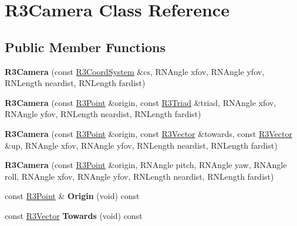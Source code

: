 \hypertarget{class_r3_camera}{}\section{R3\+Camera Class Reference}
\label{class_r3_camera}
\subsection*{Public Member Functions}
\begin{DoxyCompactItemize}
\item 
{\bfseries R3\+Camera} (const \hyperlink{class_r3_coord_system}{R3\+Coord\+System} \&cs, R\+N\+Angle xfov, R\+N\+Angle yfov, R\+N\+Length neardist, R\+N\+Length fardist)\hypertarget{class_r3_camera_a048a9fa556a75fad946f802abfe94a33}{}\label{class_r3_camera_a048a9fa556a75fad946f802abfe94a33}

\item 
{\bfseries R3\+Camera} (const \hyperlink{class_r3_point}{R3\+Point} \&origin, const \hyperlink{class_r3_triad}{R3\+Triad} \&triad, R\+N\+Angle xfov, R\+N\+Angle yfov, R\+N\+Length neardist, R\+N\+Length fardist)\hypertarget{class_r3_camera_a353a3e5700f2f310bec22535e25a28fd}{}\label{class_r3_camera_a353a3e5700f2f310bec22535e25a28fd}

\item 
{\bfseries R3\+Camera} (const \hyperlink{class_r3_point}{R3\+Point} \&origin, const \hyperlink{class_r3_vector}{R3\+Vector} \&towards, const \hyperlink{class_r3_vector}{R3\+Vector} \&up, R\+N\+Angle xfov, R\+N\+Angle yfov, R\+N\+Length neardist, R\+N\+Length fardist)\hypertarget{class_r3_camera_aeb02ab186aa2b8986279b48fed4b3eca}{}\label{class_r3_camera_aeb02ab186aa2b8986279b48fed4b3eca}

\item 
{\bfseries R3\+Camera} (const \hyperlink{class_r3_point}{R3\+Point} \&origin, R\+N\+Angle pitch, R\+N\+Angle yaw, R\+N\+Angle roll, R\+N\+Angle xfov, R\+N\+Angle yfov, R\+N\+Length neardist, R\+N\+Length fardist)\hypertarget{class_r3_camera_a73208317d4b4efdacc1577134b7e4a63}{}\label{class_r3_camera_a73208317d4b4efdacc1577134b7e4a63}

\item 
const \hyperlink{class_r3_point}{R3\+Point} \& {\bfseries Origin} (void) const \hypertarget{class_r3_camera_a025d8679a2de95b019eb6690b90ac0d2}{}\label{class_r3_camera_a025d8679a2de95b019eb6690b90ac0d2}

\item 
const \hyperlink{class_r3_vector}{R3\+Vector} {\bfseries Towards} (void) const \hypertarget{class_r3_camera_a599d7da0c62dbe7611494d829bb877ff}{}\label{class_r3_camera_a599d7da0c62dbe7611494d829bb877ff}


\end{DoxyCompactItemize}
